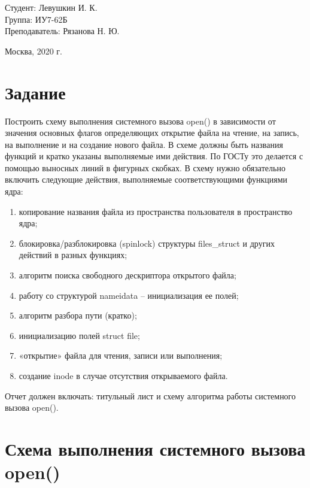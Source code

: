 \documentclass[a4paper,12pt]{article}
\begin{document}
	\large
	\begin{flushright}
		Студент: Левушкин И. К. \\
		Группа: ИУ7-62Б \\
		Преподаватель: Рязанова Н. Ю. \\
	\end{flushright}
	
	\vspace*{30mm}
	\begin{center}
		Москва, 2020 г.  
	\end{center}
	\thispagestyle{empty}
	
	
	\newpage
	
	\section*{Задание}
	
	Построить схему выполнения системного вызова open() в зависимости от значения основных флагов определяющих открытие файла на чтение, на запись, на выполнение и на создание нового файла. В схеме должны быть названия функций и кратко указаны выполняемые ими действия. По ГОСТу это делается с помощью выносных линий в фигурных скобках.
	В схему нужно обязательно включить следующие действия, выполняемые соответствующими функциями ядра:
	\begin{enumerate}
		\item копирование названия файла из пространства пользователя в пространство ядра;
		\item блокировка/разблокировка (spinlock) структуры files\_struct и других действий в разных функциях;
		\item алгоритм поиска свободного дескриптора открытого файла;
		\item работу со структурой nameidata – инициализация ее полей;
		\item алгоритм разбора пути (кратко);
		\item инициализацию полей struct file;
		\item «открытие» файла для чтения, записи или выполнения; 
		\item создание inode в случае отсутствия открываемого файла.
	\end{enumerate}
	Отчет должен включать: титульный лист и схему алгоритма работы системного вызова open().
	
	\newpage
	
	\section*{Схема выполнения системного вызова open()}
	
\end{document}
